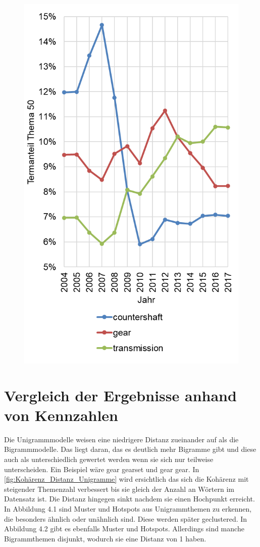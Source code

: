\begin{figure}[!ht]
\begin{floatrow}
{			\includegraphics[width=\linewidth,keepaspectratio=true]{img/DLDA_topic_50.png}
		}
	\end{floatrow}
\end{figure}


\section{Vergleich der Ergebnisse anhand von Kennzahlen}
Die Unigrammmodelle weisen eine niedrigere Distanz zueinander auf als die Bigrammmodelle. Das liegt daran, das es deutlich mehr Bigramme gibt und diese auch als unterschiedlich gewertet werden wenn sie sich nur teilweise unterscheiden. Ein Beispiel wäre gear gearset und gear gear. In \ref{fig:Kohärenz_Distanz_Unigramme} wird ersichtlich das sich die Kohärenz mit steigender Themenzahl verbessert bis sie gleich der Anzahl an Wörtern im Datensatz ist. Die Distanz hingegen sinkt nachdem sie einen Hochpunkt erreicht. In Abbildung 4.1 sind Muster und Hotspots aus Unigrammthemen zu erkennen, die besonders ähnlich oder unähnlich sind. Diese werden später geclustered. In Abbildung 4.2 gibt es ebenfalls Muster und Hotspots. Allerdings sind manche Bigrammthemen disjunkt, wodurch sie eine Distanz von 1 haben. 

